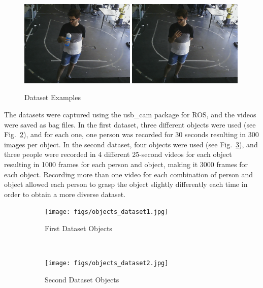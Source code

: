 \begin{figure}[H]
    \centerline{\includegraphics[width=0.49\textwidth]{figs/dataset_preprocessing1_1.png} \includegraphics[width=0.49\textwidth]{figs/dataset_preprocessing1_2.png}}
    \caption[Dataset Examples]{Dataset Examples}
    \label{fig:dataset_examples}
\end{figure}

The datasets were captured using the usb\_cam package for ROS, and the videos were saved as bag files. In the first dataset, three different objects were used (see Fig.~\ref{fig:objects_dataset1}), and for each one, one person was recorded for 30 seconds resulting in 300 images per object. In the second dataset, four objects were used (see Fig.~\ref{fig:objects_dataset2}), and three people were recorded in 4 different 25-second videos for each object resulting in 1000 frames for each person and object, making it 3000 frames for each object. Recording more than one video for each combination of person and object allowed each person to grasp the object slightly differently each time in order to obtain a more diverse dataset.

\begin{figure}[H]
    \centering
    \begin{subfigure}[b]{0.49\textwidth}
        \texttt{[image: figs/objects\_dataset1.jpg]}
        \caption{First Dataset Objects}
        \label{fig:objects_dataset1}
    \end{subfigure} \
    \begin{subfigure}[b]{0.49\textwidth}
        \texttt{[image: figs/objects\_dataset2.jpg]}
        \caption{Second Dataset Objects}
        \label{fig:objects_dataset2}
    \end{subfigure}
    \caption[Dataset Objects]{}
    \label{fig:dataset_objects}
\end{figure}

